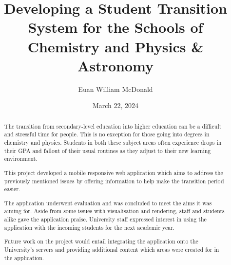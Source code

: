\documentclass{l4proj}
\begin{document}
\title{Developing a Student Transition System for the Schools of Chemistry and Physics \& Astronomy}
\author{Euan William McDonald}
\date{March 22,  2024}

\maketitle

\begin{abstract}
    The transition from secondary-level education into higher education can be a difficult and stressful time for people. This is no exception for those going into degrees in chemistry and physics. Students in both these subject areas often experience drops in their GPA and fallout of their usual routines as they adjust to their new learning environment. 
    
    This project developed a mobile responsive web application which aims to address the previously mentioned issues by offering information to help make the transition period easier.

    The application underwent evaluation and was concluded to meet the aims it was aiming for. Aside from some issues with visualisation and rendering,  staff and students alike gave the application praise. University staff expressed interest in using the application with the incoming students for the next academic year.

    Future work on the project would entail integrating the application onto the University's servers and providing additional content which areas were created for in the application.
\end{abstract}


%
%
\def\consentname {Euan William McDonald} %
\def\consentdate {22 March 2024} %
%
\educationalconsent
\end{document}
